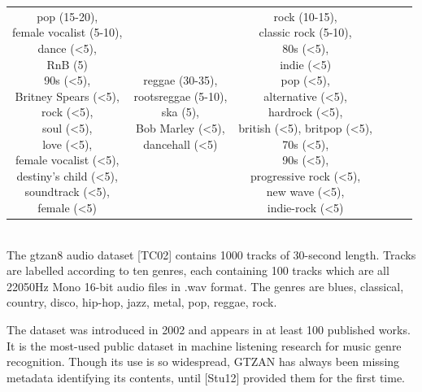 \documentclass[english, LaM, oneside, noexaminfo]{sapthesis}
\begin{document}
\begin{table}[htbp]
{\begin{tabular}{|c|c|c|c|c|c|}
\makecell{pop (15-20),\\female vocalist (5-10),\\dance (<5),\\RnB (5)\\90s (<5),\\Britney Spears (<5),\\rock (<5),\\soul (<5),\\ love (<5),\\ female vocalist (<5),\\ destiny's child (<5),\\soundtrack (<5),\\ female (<5)} &
\makecell{reggae (30-35),\\rootsreggae (5-10),\\ska (5),\\Bob Marley (<5),\\dancehall (<5)} &
\makecell{rock (10-15),\\classic rock (5-10),\\80s (<5),\\indie (<5)\\pop (<5),\\alternative (<5),\\hardrock (<5),\\british (<5), britpop (<5),\\ 70s (<5),\\ 90s (<5),\\progressive rock (<5),\\new wave (<5),\\indie-rock (<5)} &
\hline
\end{tabular}}\end{table}

\\

The gtzan8 audio dataset [TC02] contains 1000 tracks of 30-second length. Tracks are labelled according to ten genres, each containing 100 tracks which are all 22050Hz Mono 16-bit audio files in .wav format. The genres are blues, classical, country, disco, hip-hop, jazz, metal, pop, reggae, rock.

The dataset was introduced in 2002 and appears in at least 100 published works. It is the most-used public dataset in machine listening research for music genre recognition. Though its use is so widespread, GTZAN has always been missing metadata identifying its contents, until [Stu12] provided them for the first time.
\end{document}

